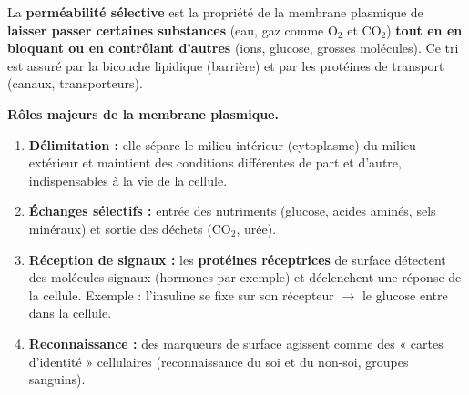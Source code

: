 \documentclass[11pt]{article}
\begin{document}
\begin{definition}
La \textbf{perméabilité sélective} est la propriété de la membrane plasmique de \textbf{laisser passer certaines substances} (eau, gaz comme O$_2$ et CO$_2$) \textbf{tout en en bloquant ou en contrôlant d'autres} (ions, glucose, grosses molécules). Ce tri est assuré par la bicouche lipidique (barrière) et par les protéines de transport (canaux, transporteurs).
\end{definition}

\textbf{Rôles majeurs de la membrane plasmique.}\par
\begin{enumerate}
    \item \textbf{Délimitation :} elle sépare le milieu intérieur (cytoplasme) du milieu extérieur et maintient des conditions différentes de part et d'autre, indispensables à la vie de la cellule.
    \item \textbf{Échanges sélectifs :} entrée des nutriments (glucose, acides aminés, sels minéraux) et sortie des déchets (CO$_2$, urée).
    \item \textbf{Réception de signaux :} les \textbf{protéines réceptrices} de surface détectent des molécules signaux (hormones par exemple) et déclenchent une réponse de la cellule. Exemple : l'insuline se fixe sur son récepteur $\rightarrow$ le glucose entre dans la cellule.
    \item \textbf{Reconnaissance :} des marqueurs de surface agissent comme des « cartes d'identité » cellulaires (reconnaissance du soi et du non-soi, groupes sanguins).
\end{enumerate}
\end{document}
